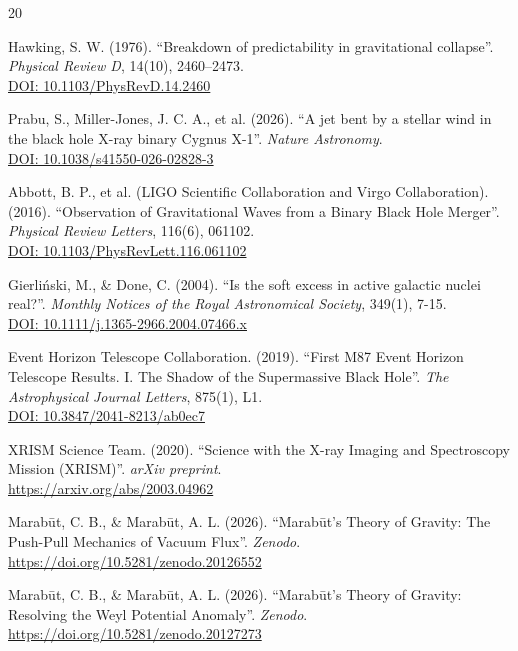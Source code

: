 \documentclass[11pt, a4paper]{article}
\newcommand{\doi}[1]{\href{https://doi.org/#1}{DOI: #1}}
\begin{document}
\clearpage
\begin{thebibliography}{20}

  Hawking, S. W. (1976).
  ``Breakdown of predictability in gravitational collapse''. \textit{Physical Review D}, 14(10), 2460--2473. \\
  \doi{10.1103/PhysRevD.14.2460}

  Prabu, S., Miller-Jones, J. C. A., et al. (2026).
  ``A jet bent by a stellar wind in the black hole X-ray binary Cygnus X-1''. \textit{Nature Astronomy}. \\
  \doi{10.1038/s41550-026-02828-3}

  Abbott, B. P., et al. (LIGO Scientific Collaboration and Virgo Collaboration). (2016).
  ``Observation of Gravitational Waves from a Binary Black Hole Merger''. \textit{Physical Review Letters}, 116(6), 061102. \\
  \doi{10.1103/PhysRevLett.116.061102}
  
  Gierli\'nski, M., \& Done, C. (2004). 
  ``Is the soft excess in active galactic nuclei real?''. \textit{Monthly Notices of the Royal Astronomical Society}, 349(1), 7-15. \\
  \doi{10.1111/j.1365-2966.2004.07466.x}

  Event Horizon Telescope Collaboration. (2019).
  ``First M87 Event Horizon Telescope Results. I. The Shadow of the Supermassive Black Hole''. \textit{The Astrophysical Journal Letters}, 875(1), L1. \\
  \doi{10.3847/2041-8213/ab0ec7}

  XRISM Science Team. (2020).
  ``Science with the X-ray Imaging and Spectroscopy Mission (XRISM)''. \textit{arXiv preprint}. \\
  \url{https://arxiv.org/abs/2003.04962}

  Marab\={u}t, C. B., \& Marab\={u}t, A. L. (2026). ``Marab\={u}t's Theory of Gravity: The Push-Pull Mechanics of Vacuum Flux''. \textit{Zenodo}. \\
  \url{https://doi.org/10.5281/zenodo.20126552}

  Marab\={u}t, C. B., \& Marab\={u}t, A. L. (2026). ``Marab\={u}t's Theory of Gravity: Resolving the Weyl Potential Anomaly''. \textit{Zenodo}. \\
  \url{https://doi.org/10.5281/zenodo.20127273}


\end{thebibliography}
\end{document}
